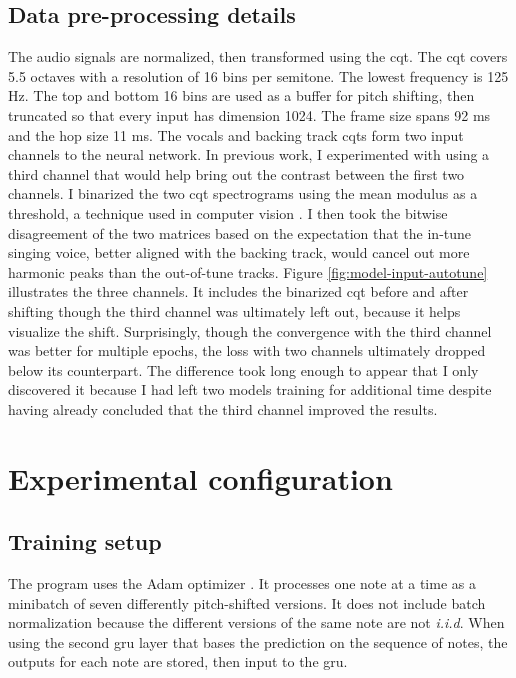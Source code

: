 \subsection{Data pre-processing details}
\label{sec:data-format-autotune}
The audio signals are normalized, then transformed using the \gls{cqt}. The \gls{cqt} covers 5.5 octaves with a resolution of 16 bins per semitone. The lowest frequency is 125 Hz. The top and bottom 16 bins are used as a buffer for pitch shifting, then truncated so that every input has dimension 1024. The frame size spans 92 ms and the hop size 11 ms. The vocals and backing track \gls{cqt}s form two input channels to the neural network. In previous work, I experimented with using a third channel that would help bring out the contrast between the first two channels. I binarized the two \gls{cqt} spectrograms using the mean modulus as a threshold, a technique used in computer vision \cite{sezgin2004survey}. I then took the bitwise disagreement of the two matrices based on the expectation that the in-tune singing voice, better aligned with the backing track, would cancel out more harmonic peaks than the out-of-tune tracks. Figure \ref{fig:model-input-autotune} illustrates the three channels. It includes the binarized \gls{cqt} before and after shifting though the third channel was ultimately left out, because it helps visualize the shift. Surprisingly, though the convergence with the third channel was better for multiple epochs, the loss with two channels ultimately dropped below its counterpart. The difference took long enough to appear that I only discovered it because I had left two models training for additional time despite having already concluded that the third channel improved the results. 

\section{Experimental configuration}
\label{sec:experiments-autotune}
\subsection{Training setup}
The program uses the Adam optimizer \cite{kingma2014adam}. It processes one note at a time as a minibatch of seven differently pitch-shifted versions. It does not include batch normalization because the different versions of the same note are not \textit{i.i.d}. When using the second \gls{gru} layer that bases the prediction on the sequence of notes, the outputs for each note are stored, then input to the \gls{gru}. 

